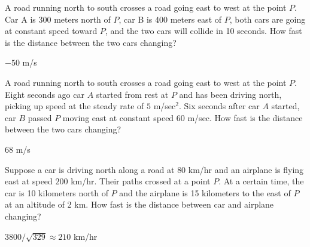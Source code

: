 \begin{exercises}
\begin{exercise}
A road running north to south crosses a road going east to west at the
point $P$. Car A is 300 meters north of $P$, car B is 400 meters east
of $P$, both cars are going at constant speed toward $P$, and the two
cars will collide in 10 seconds. How fast is the distance between the
two cars changing?
\begin{answer} $-50$ m/s
\end{answer}\end{exercise}

\begin{exercise}
A road running north to south crosses a road going east to west at the
point $P$. Eight seconds ago car $A$ started from rest at $P$ and has
been driving north, picking up speed at the steady rate of $5$
m/sec${}^2$. Six seconds after car $A$ started, car $B$ passed $P$
moving east at constant speed 60 m/sec. How fast is the distance
between the two cars changing?
\begin{answer} $68$ m/s
\end{answer}\end{exercise}

\begin{exercise} 
Suppose a car is driving north along a road at $80$ km/hr and an
airplane is flying east at speed $200$ km/hr. Their paths crossed at a
point $P$. At a certain time, the car is 10 kilometers north of $P$
and the airplane is 15 kilometers to the east of $P$ at an altitude of
2 km. How fast is the distance between car and airplane changing?
\begin{answer} $3800/\sqrt{329}\approx 210$ km/hr 
\end{answer}\end{exercise}





\end{exercises}

